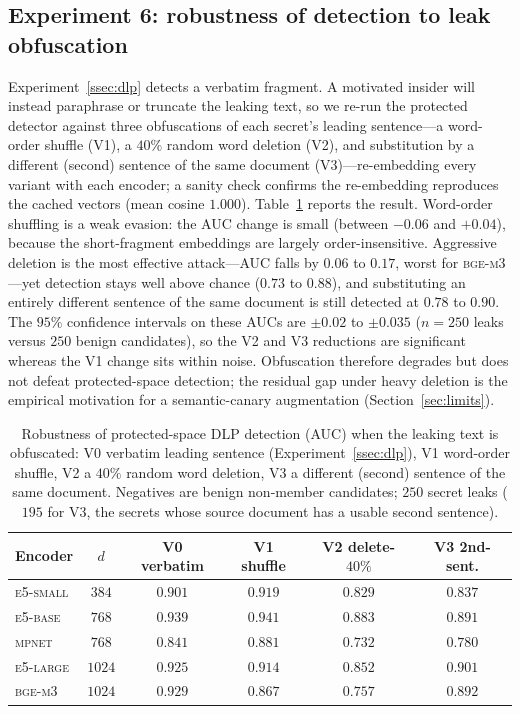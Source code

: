 \documentclass[11pt,a4paper]{article}
\begin{document}
\subsection{Experiment 6: robustness of detection to leak obfuscation}
\label{ssec:dlp-evade}

Experiment~\ref{ssec:dlp} detects a verbatim fragment. A motivated insider
will instead paraphrase or truncate the leaking text, so we re-run the
protected detector against three obfuscations of each secret's leading
sentence---a word-order shuffle (V1), a $40\%$ random word deletion (V2),
and substitution by a different (second) sentence of the same document
(V3)---re-embedding every variant with each encoder; a sanity check
confirms the re-embedding reproduces the cached vectors (mean cosine
$1.000$). Table~\ref{tab:dlp-evade} reports the result. Word-order
shuffling is a weak evasion: the AUC change is small (between $-0.06$ and
$+0.04$), because the short-fragment embeddings are largely
order-insensitive. Aggressive deletion is the most effective attack---AUC
falls by $0.06$ to $0.17$, worst for \textsc{bge-m3}---yet detection stays
well above chance ($0.73$ to $0.88$), and substituting an entirely
different sentence of the same document is still detected at $0.78$ to
$0.90$. The $95\%$ confidence intervals on these AUCs are $\pm0.02$ to $\pm0.035$ ($n=250$ leaks versus $250$ benign candidates), so the V2 and V3 reductions are significant whereas the V1 change sits within noise. Obfuscation therefore degrades but does not defeat protected-space
detection; the residual gap under heavy deletion is the empirical
motivation for a semantic-canary augmentation (Section~\ref{sec:limits}).

\begin{table}[tb]\centering
\caption{Robustness of protected-space DLP detection (AUC) when the
leaking text is obfuscated: V0 verbatim leading sentence
(Experiment~\ref{ssec:dlp}), V1 word-order shuffle, V2 a $40\%$ random
word deletion, V3 a different (second) sentence of the same document.
Negatives are benign non-member candidates; $250$ secret leaks ($195$ for
V3, the secrets whose source document has a usable second sentence).}
\label{tab:dlp-evade}
\small
\begin{tabular}{lccccc}
\toprule
Encoder & $d$ & V0 verbatim & V1 shuffle & V2 delete-$40\%$ & V3 2nd-sent. \\
\midrule
\textsc{e5-small} & $384$  & $0.901$ & $0.919$ & $0.829$ & $0.837$ \\
\textsc{e5-base}  & $768$  & $0.939$ & $0.941$ & $0.883$ & $0.891$ \\
\textsc{mpnet}    & $768$  & $0.841$ & $0.881$ & $0.732$ & $0.780$ \\
\textsc{e5-large} & $1024$ & $0.925$ & $0.914$ & $0.852$ & $0.901$ \\
\textsc{bge-m3}   & $1024$ & $0.929$ & $0.867$ & $0.757$ & $0.892$ \\
\bottomrule
\end{tabular}
\end{table}
\end{document}

